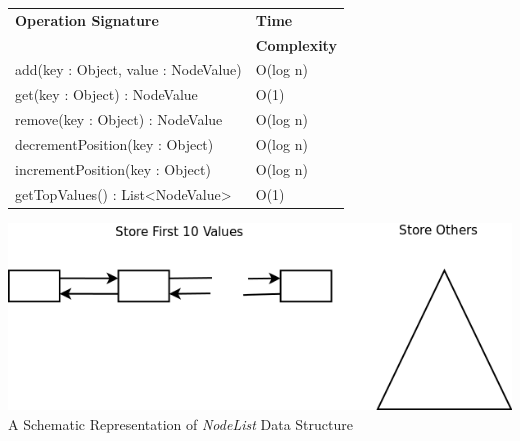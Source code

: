 \documentclass[landscape,paperwidth=42in, paperheight=36in, fontscale=0.292]{baposter}
\begin{document}
\begin{poster}
{\begin{minipage}[t]{0.6\linewidth}
\begin{center}
\begin{tabular}{l l}
\toprule
\textbf{Operation Signature} & \textbf{Time} \\
 & \textbf{Complexity} \\
\midrule
add(key : Object, value : NodeValue) & O(log n) \\ 
get(key : Object) : NodeValue & O(1) \\ 
remove(key : Object) : NodeValue & O(log n) \\ 
decrementPosition(key : Object) & O(log n) \\ 
incrementPosition(key : Object) & O(log n) \\ 
getTopValues() : List<NodeValue> & O(1) \\ 
\bottomrule
\end{tabular}
\end{center}

\end{minipage}
\hspace{1em plus 1fill}
  \begin{minipage}[t]{0.35\linewidth}
    \centering
   \vspace{-2ex}
   \includegraphics[width=0.8\linewidth, height=0.4\linewidth]{nodeliststruct.png}
   \\\smaller A Schematic Representation of \textit{NodeList} Data Structure
\end{minipage}

}


\end{poster}
\end{document}
